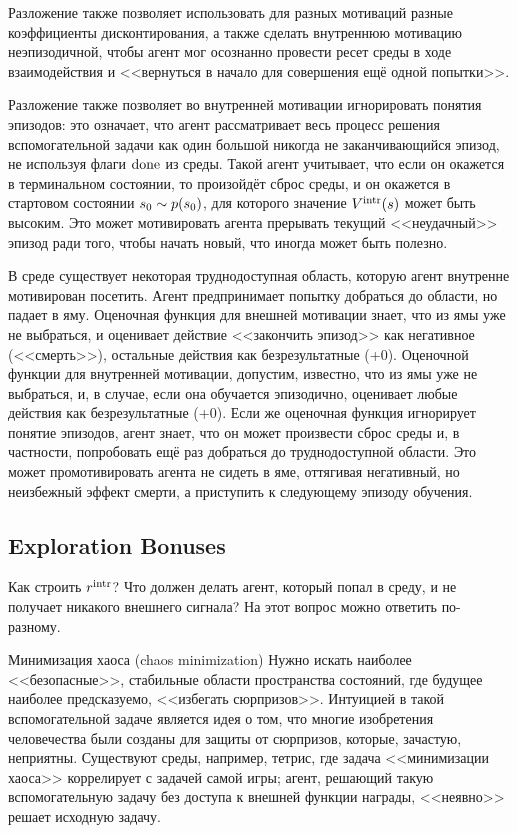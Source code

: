\begin{remark}
Разложение также позволяет использовать для разных мотиваций разные коэффициенты дисконтирования, а также сделать внутреннюю мотивацию неэпизодичной, чтобы агент мог осознанно провести ресет среды в ходе взаимодействия и <<вернуться в начало для совершения ещё одной попытки>>.
\end{remark}

Разложение также позволяет во внутренней мотивации игнорировать понятия эпизодов: это означает, что агент рассматривает весь процесс решения вспомогательной задачи как один большой никогда не заканчивающийся эпизод, не используя флаги $\mathrm{done}$ из среды. Такой агент учитывает, что если он окажется в терминальном состоянии, то произойдёт сброс среды, и он окажется в стартовом состоянии $s_0 \HM\sim p(s_0)$, для которого значение $V^{\mathrm{intr}}(s)$ может быть высоким. Это может мотивировать агента прерывать текущий <<неудачный>> эпизод ради того, чтобы начать новый, что иногда может быть полезно.

\vspace{0.2cm}
\begin{example}
В среде существует некоторая труднодоступная область, которую агент внутренне мотивирован посетить. Агент предпринимает попытку добраться до области, но падает в яму. Оценочная функция для внешней мотивации знает, что из ямы уже не выбраться, и оценивает действие <<закончить эпизод>> как негативное (<<смерть>>), остальные действия как безрезультатные (+0). Оценочной функции для внутренней мотивации, допустим, известно, что из ямы уже не выбраться, и, в случае, если она обучается эпизодично, оценивает любые действия как безрезультатные (+0). Если же оценочная функция игнорирует понятие эпизодов, агент знает, что он может произвести сброс среды и, в частности, попробовать ещё раз добраться до труднодоступной области. Это может промотивировать агента не сидеть в яме, оттягивая негативный, но неизбежный эффект смерти, а приступить к следующему эпизоду обучения.
\end{example}

\subsection{Exploration Bonuses}

Как строить $r^{\mathrm{intr}}$? Что должен делать агент, который попал в среду, и не получает никакого внешнего сигнала? На этот вопрос можно ответить по-разному.

\begin{exampleBox}[label=ex:chaosminimization]{Минимизация хаоса (chaos minimization)}
Нужно искать наиболее <<безопасные>>, стабильные области пространства состояний, где будущее наиболее предсказуемо, <<избегать сюрпризов>>. Интуицией в такой вспомогательной задаче является идея о том, что многие изобретения человечества были созданы для защиты от сюрпризов, которые, зачастую, неприятны. Существуют среды, например, тетрис, где задача <<минимизации хаоса>> коррелирует с задачей самой игры; агент, решающий такую вспомогательную задачу без доступа к внешней функции награды, <<неявно>> решает исходную задачу.
\end{exampleBox}

